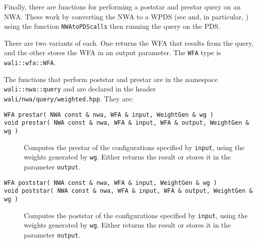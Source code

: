 Finally, there are functions for performing a poststar and prestar
query on an NWA. These work by converting the NWA to a WPDS (see
 and, in particular, ) using
the function \texttt{NWAtoPDScalls} then running the query on the PDS.

There are two variants of each. One returns the WFA that results from
the query, and the other stores the WFA in an output parameter. The
\texttt{WFA} type is \texttt{wali::wfa::WFA}.

The functions that perform poststar and prestar are in the namespace
\texttt{wali::nwa::query} and are declared in the header
\texttt{wali/nwa/query/weighted.hpp}. They are:
\begin{description}
  \item[\texttt{WFA prestar( NWA const \& nwa, WFA \& input, WeightGen \& wg )}]
  \item[\texttt{void prestar( NWA const \& nwa, WFA \& input, WFA \& output, WeightGen \& wg )}]
    Computes the prestar of the configurations specified by
    \texttt{input}, using the weights generated by \texttt{wg}. Either
    returns the result or stores it in the parameter \texttt{output}.
  \item[\texttt{WFA poststar( NWA const \& nwa, WFA \& input, WeightGen \& wg )}]
  \item[\texttt{void poststar( NWA const \& nwa, WFA \& input, WFA \& output, WeightGen \& wg )}]
    Computes the poststar of the configurations specified by
    \texttt{input}, using the weights generated by \texttt{wg}. Either
    returns the result or stores it in the parameter \texttt{output}.
\end{description}

